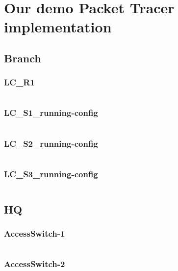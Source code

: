 \clearpage %
\appendix

\section{Our demo Packet Tracer implementation} \label{config}

\subsection{Branch} \label{configbranch}
\subsubsection{LC\_R1} \label{configwlc}
\inputminted[fontsize=\tiny,linenos,breaklines]{text}{./Config/Branch/LC-R1.txt}
\subsubsection{LC\_S1\_running-config} \label{configwlc}
\inputminted[fontsize=\tiny,linenos,breaklines]{text}{./Config/Branch/LC-S1-running-config.txt}
\subsubsection{LC\_S2\_running-config} \label{configwlc}
\inputminted[fontsize=\tiny,linenos,breaklines]{text}{./Config/Branch/LC-S2-running-config.txt}
\subsubsection{LC\_S3\_running-config} \label{configwlc}
\inputminted[fontsize=\tiny,linenos,breaklines]{text}{./Config/Branch/LC-S3-running-config.txt}

\subsection{HQ} \label{confighq}
\subsubsection{AccessSwitch-1} \label{configwlc}
\inputminted[fontsize=\tiny,linenos,breaklines]{text}{./Config/HQ/AccessSwitch-1.txt}
\subsubsection{AccessSwitch-2} \label{configwlc}
\inputminted[fontsize=\tiny,linenos,breaklines]{text}{./Config/HQ/AccessSwitch-2.txt}
